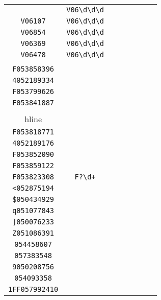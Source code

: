 \begin{longtable}{cccccccc}
\begin{tabular}{ll}
    \verb|V06510| & \verb|V06\d\d\d|\\
\verb|V06107| & \verb|V06\d\d\d|\\
\verb|V06854| & \verb|V06\d\d\d|\\
\verb|V06369| & \verb|V06\d\d\d|\\
\verb|V06478| & \verb|V06\d\d\d|
\end{tabular}
\\\midrule 
\begin{tabular}{l}
    \verb|F053830644|\\
\verb|F053858396|\\
\verb|4052189334|\\
\verb|F053799626|\\
\verb|F053841887|\\
\\hline\\
\verb|F053818771|\\
\verb|4052189176|\\
\verb|F053852090|\\
\verb|F053859122|\\
\verb|F053823308|
\end{tabular}

&
\verb|F?\d+|
&

\begin{tabular}{l}
    \verb|.05\d\d\d\d\d\d\d|\\
\verb|<052875194|\\
\verb|$050434929|\\
\verb|q051077843|\\
\verb|]050076233|\\
\verb|Z051086391|
\end{tabular}

&

\begin{tabular}{l}
    \verb|(\d)*(F)*05\d\d\d\d\d\d\d|\\
\verb|054458607|\\
\verb|057383548|\\
\verb|9050208756|\\
\verb|054093358|\\
\verb|1FF057992410|
\end{tabular}

&


\end{longtable}

